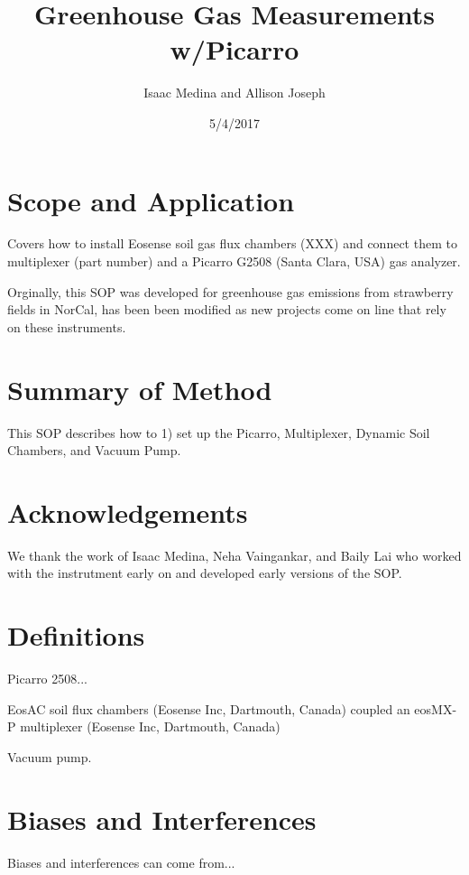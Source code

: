 \documentclass[12pt]{../SOP3}\usepackage[]{graphicx}\usepackage[]{color}
\title{Greenhouse Gas Measurements w/Picarro}
\date{5/4/2017}
\author{Isaac Medina and Allison Joseph}
\begin{document}
\maketitle

\section{Scope and Application}

\NP Covers how to install Eosense soil gas flux chambers (XXX) and connect them to multiplexer (part number) and a Picarro G2508 (Santa Clara, USA) gas analyzer.

\NP Orginally, this SOP was developed for greenhouse gas emissions from strawberry fields in NorCal, has been been modified as new projects come on line that rely on these instruments. 

\section{Summary of Method}

\NP This SOP describes how to 1) set up the Picarro, Multiplexer, Dynamic Soil Chambers, and Vacuum Pump. 

\tableofcontents

\newpage

\section{Acknowledgements}

We thank the work of Isaac Medina, Neha Vaingankar, and Baily Lai who worked with the instrutment early on and developed early versions of the SOP. 

\section{Definitions}

\NP Picarro 2508...

\NP EosAC soil flux chambers (Eosense Inc, Dartmouth, Canada) coupled an 
\NP eosMX-P multiplexer (Eosense Inc, Dartmouth, Canada)

\NP Vacuum pump.

\section{Biases and Interferences}

\NP Biases and interferences can come from...
\end{document}
